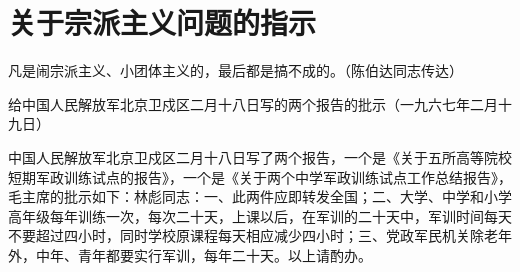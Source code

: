 \section[关于宗派主义问题的指示（一九六七年二月）]{关于宗派主义问题的指示}


凡是闹宗派主义、小团体主义的，最后都是搞不成的。（陈伯达同志传达）

给中国人民解放军北京卫戍区二月十八日写的两个报告的批示（一九六七年二月十九日）

中国人民解放军北京卫戍区二月十八日写了两个报告，一个是《关于五所高等院校短期军政训练试点的报告》，一个是《关于两个中学军政训练试点工作总结报告》，毛主席的批示如下：林彪同志：一、此两件应即转发全国；二、大学、中学和小学高年级每年训练一次，每次二十天，上课以后，在军训的二十天中，军训时间每天不要超过四小时，同时学校原课程每天相应减少四小时；三、党政军民机关除老年外，中年、青年都要实行军训，每年二十天。以上请酌办。



